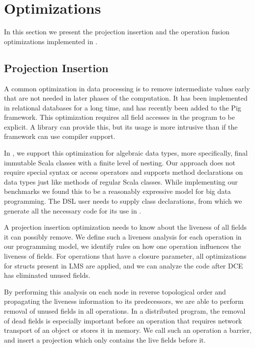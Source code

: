 \section{Optimizations}
\label{sec:optimizations}
In this section we present the projection insertion and the operation fusion
optimizations implemented in \tool.
\subsection{Projection Insertion}
\label{sec:field-reduction}
\newcommand{\aos}{AoS $\rightarrow$ SoA }

A common optimization in data processing is to remove intermediate values early
that are not needed in later phases of the computation. It has been implemented
in relational databases for a long time, and has recently been added to the Pig
framework. This optimization requires all field accesses in the program to be
explicit. A library can provide this, but its usage is more intrusive than if
the framework can use compiler support.

In \tool, we support this optimization for algebraic data types, more
specifically, final immutable Scala classes with a finite level of nesting. Our
approach does not require special syntax or access operators and supports method
declarations on data types just like methods of regular Scala classes. While
implementing our benchmarks we found this to be a reasonably expressive model
for big data programming. The DSL user needs to supply class declarations, from
which we generate all the necessary code for its use in \tool.

A projection insertion optimization needs to know about the liveness of all
fields it can possibly remove. We define such a liveness analysis for each
operation in our programming model, 
we identify rules on how one operation influences the liveness of fields. For
operations that have a closure parameter, all optimizations for structs present
in LMS are applied, and we can analyze the code after DCE has eliminated unused
fields.

By performing this analysis on each node in reverse topological order and
propagating the liveness information to its predecessors, we are able to perform
removal of unused fields in all operations. In a distributed program, the
removal of dead fields is especially important before an operation that requires
network transport of an object or stores it in memory. We call such an operation
a barrier, and insert a projection which only contains the live fields before
it.

